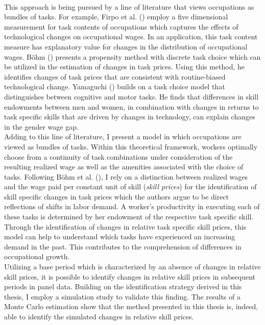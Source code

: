 \documentclass[../main.tex]{subfiles}
\begin{document}
\\
This approach is being pursued by a line of literature that views occupations as bundles of tasks. For example, Firpo et al. (\citeyear{firpo2011occupational}) employ a five dimensional measurement for task contents of occupations which captures the effects of technological changes on occupational wages. In an application, this task content measure has explanatory value for changes in the distribution of occupational wages. Böhm (\citeyear{bohm2019price}) presents a propensity method with discrete task choice which can be utilized in the estimation of changes in task prices. Using this method, he identifies changes of task prices that are consistent with routine-biased technological change. Yamaguchi (\citeyear{yamaguchi2018changes}) builds on a task choice model that distinguishes between cognitive and motor tasks. He finds that differences in skill endowments between men and women, in combination with changes in returns to task specific skills that are driven by changes in technology, can explain changes in the gender wage gap.
\\
Adding to this line of literature, I present a model in which occupations are viewed as bundles of tasks. Within this theoretical framework, workers optimally choose from a continuity of task combinations under consideration of the resulting realized wage as well as the amenities associated with the choice of tasks. Following Böhm et al. (\citeyear{bohm2019occupation}), I rely on a distinction between realized wages and the wage paid per constant unit of skill (\textit{skill prices}) for the identification of skill specific changes in task prices which the authors argue to be direct reflections of shifts in labor demand. A worker's productivity in executing each of these tasks is determined by her endowment of the respective task specific skill.
\\
Through the identification of changes in relative task specific skill prices, this model can help to understand which tasks have experienced an increasing demand in the past. This contributes to the comprehension of differences in occupational growth.
\\
Utilizing a base period which is characterized by an absence of changes in relative skill prices, it is possible to identify changes in relative skill prices in subsequent periods in panel data. Building on the identification strategy derived in this thesis, I employ a simulation study to validate this finding. The results of a Monte Carlo estimation show that the method presented in this thesis is, indeed, able to identify the simulated changes in relative skill prices.
\end{document}
